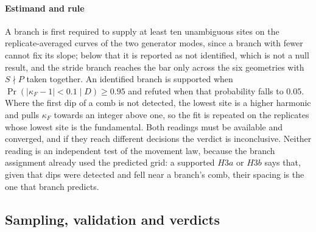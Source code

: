 \paragraph{Estimand and rule} A branch is first required to supply at least ten unambiguous sites on the replicate-averaged curves of the two generator modes, since a branch with fewer cannot fix its slope; below that it is reported as not identified, which is not a null result, and the stride branch reaches the bar only across the six geometries with $S\nmid P$ taken together. An identified branch is supported when $\Pr(|\kappa_F-1|<0.1\mid D)\ge0.95$ and refuted when that probability falls to $0.05$. Where the first dip of a comb is not detected, the lowest site is a higher harmonic and pulls $\kappa_F$ towards an integer above one, so the fit is repeated on the replicates whose lowest site is the fundamental. Both readings must be available and converged, and if they reach different decisions the verdict is inconclusive. Neither reading is an independent test of the movement law, because the branch assignment already used the predicted grid: a supported $H3a$ or $H3b$ says that, given that dips were detected and fell near a branch's comb, their spacing is the one that branch predicts.



\subsection{Sampling, validation and verdicts}

